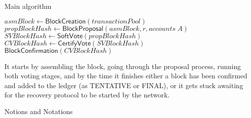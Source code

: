 \documentclass[10pt,a4paper]{article}
\begin{document}
\begin{section}{Main algorithm}
\begin{algorithm}[H]
    \begin{algorithmic}[1]
    
    \State $asmBlock \gets \mathsf{BlockCreation}(transactionPool)$
    \State $propBlockHash \gets \mathsf{BlockProposal}(asmBlock, r, accounts\;A)$
    \State $SVBlockHash \gets \mathsf{SoftVote}(propBlockHash)$
    \State $CVBlockHash \gets \mathsf{CertifyVote}(SVBlockHash)$
    \State $\mathsf{BlockConfirmation}(CVBlockHash)$

    \EndFunction
    \end{algorithmic}
    \caption{\underline{Main node algorithm}}
\end{algorithm}

It starts by assembling the block, going through the proposal process,
running both voting stages, and by the time it finishes either a block has been
confirmed and added to the ledger (as TENTATIVE or FINAL), or it gets stuck awaiting for
the recovery protocol to be started by the network.



\begin{subsection}{Notions and Notations}




\end{subsection}
\end{section}
\end{document}
